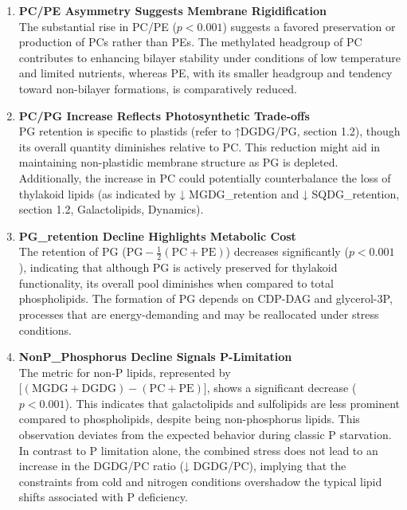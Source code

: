 \documentclass[10pt,letterpaper]{article}
\begin{document}
\begin{enumerate}
  \item \textbf{PC/PE Asymmetry Suggests Membrane Rigidification} \\
  The substantial rise in PC/PE (\(p<0.001\)) suggests a favored preservation or production of PCs rather than PEs. The methylated headgroup of PC contributes to enhancing bilayer stability under conditions of low temperature and limited nutrients, whereas PE, with its smaller headgroup and tendency toward non-bilayer formations, is comparatively reduced.
  
  \item \textbf{PC/PG Increase Reflects Photosynthetic Trade-offs} \\
  PG retention is specific to plastids (refer to ↑DGDG/PG, section 1.2), though its overall quantity diminishes relative to PC. This reduction might aid in maintaining non-plastidic membrane structure as PG is depleted. Additionally, the increase in PC could potentially counterbalance the loss of thylakoid lipids (as indicated by ↓ MGDG\_retention and ↓ SQDG\_retention, section 1.2, Galactolipids, Dynamics).
  
  \item \textbf{PG\_retention Decline Highlights Metabolic Cost} \\
  The retention of PG (\(\mathrm{PG} - \tfrac12(\mathrm{PC} + \mathrm{PE})\)) decreases significantly (\(p<0.001\)), indicating that although PG is actively preserved for thylakoid functionality, its overall pool diminishes when compared to total phospholipids. The formation of PG depends on CDP-DAG and glycerol-3P, processes that are energy-demanding and may be reallocated under stress conditions.
  
  \item \textbf{NonP\_Phosphorus Decline Signals P-Limitation} \\
  The metric for non-P lipids, represented by \(\bigl[(\mathrm{MGDG}+\mathrm{DGDG})-(\mathrm{PC}+\mathrm{PE})\bigr]\), shows a significant decrease (\(p<0.001\)). This indicates that galactolipids and sulfolipids are less prominent compared to phospholipids, despite being non-phosphorus lipids. This observation deviates from the expected behavior during classic P starvation. In contrast to P limitation alone, the combined stress does not lead to an increase in the DGDG/PC ratio (↓ DGDG/PC), implying that the constraints from cold and nitrogen conditions overshadow the typical lipid shifts associated with P deficiency.

\end{enumerate}
\end{document}
